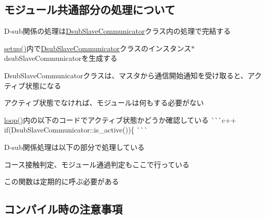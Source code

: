 \subsection*{モジュール共通部分の処理について}


\begin{DoxyItemize}
\item D-\/sub関係の処理は{\ttfamily \mbox{\hyperlink{class_dsub_slave_communicator}{Dsub\+Slave\+Communicator}}}クラス内の処理で完結する
\item {\ttfamily \mbox{\hyperlink{iraira__bo__up__down_8ino_a7dfd9b79bc5a37d7df40207afbc5431f}{setup()}}}内で{\ttfamily \mbox{\hyperlink{class_dsub_slave_communicator}{Dsub\+Slave\+Communicator}}}クラスのインスタンス{\ttfamily $\ast$dsub\+Slave\+Communicator}を生成する
\item Dsub\+Slave\+Communicatorクラスは、マスタから通信開始通知を受け取ると、アクティブ状態になる
\item アクティブ状態でなければ、モジュールは何もする必要がない
\begin{DoxyItemize}
\item {\ttfamily \mbox{\hyperlink{iraira__bo__up__down_8ino_a0b33edabd7f1c4e4a0bf32c67269be2f}{loop()}}}内の以下のコードでアクティブ状態かどうか確認している \`{}\`{}\`{}c++ if(\+Dsub\+Slave\+Communicator\+::is\+\_\+active())\{ \`{}\`{}\`{}
\end{DoxyItemize}
\item D-\/sub関係処理は以下の部分で処理している 
\begin{DoxyCode}{0}
\end{DoxyCode}

\begin{DoxyItemize}
\item コース接触判定、モジュール通過判定もここで行っている
\item この関数は定期的に呼ぶ必要がある
\end{DoxyItemize}
\end{DoxyItemize}

\subsection*{コンパイル時の注意事項}


